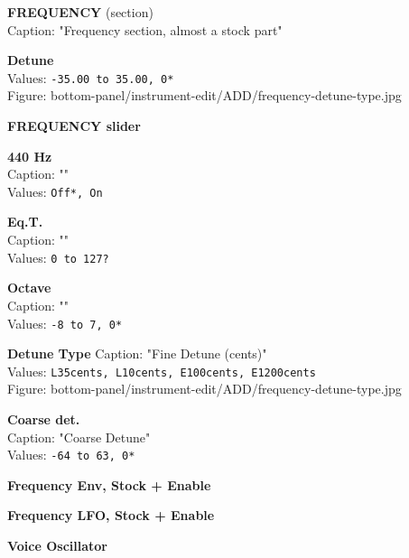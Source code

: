 \documentclass[
 11pt,
 twoside,
 a4paper,
 headinclude,
 footinclude,
 final                                 %
]{article}
\begin{document}
\begin{enumber}
\begin{enumber}
\begin{enumber}
\begin{enumber}
               \item \textbf{FREQUENCY} (section) \\
                  Caption: "Frequency section, almost a stock part"
               \begin{enumber}
                  \item \textbf{Detune} \\
                     Values: \texttt{-35.00 to 35.00, 0*} \\
                     Figure: bottom-panel/instrument-edit/ADD/frequency-detune-type.jpg
                  \item \textbf{FREQUENCY slider} \\
                  \item \textbf{440 Hz} \\         %
                     Caption: "" \\
                     Values: \texttt{Off*, On}
                  \item \textbf{Eq.T.} \\          %
                     Caption: "" \\
                     Values: \texttt{0 to 127?}
                  \item \textbf{Octave} \\
                     Caption: "" \\
                     Values: \texttt{-8 to 7, 0*}
                  \item \textbf{Detune Type}
                     Caption: "Fine Detune (cents)" \\
                     Values: \texttt{L35cents, L10cents, E100cents, E1200cents} \\
                     Figure: bottom-panel/instrument-edit/ADD/frequency-detune-type.jpg
                  \item \textbf{Coarse det.} \\
                     Caption: "Coarse Detune" \\
                     Values: \texttt{-64 to 63, 0*}
                  \item \textbf{Frequency Env, Stock + Enable}
                  \item \textbf{Frequency LFO, Stock + Enable}
                  \item \textbf{Voice Oscillator}
                  \begin{enumber}

\end{enumber}
\end{enumber}
\end{enumber}
\end{enumber}
\end{enumber}
\end{enumber}
\end{document}

